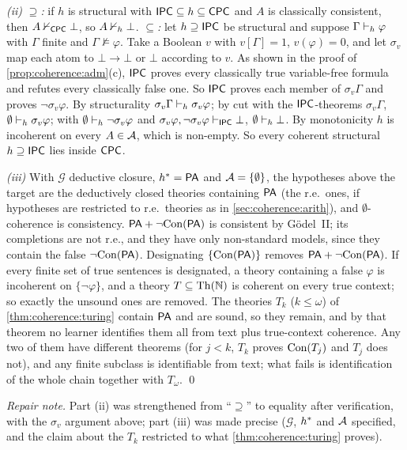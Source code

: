 \emph{(ii)} \emph{$\supseteq$:} if $h$ is structural with $\mathsf{IPC}\subseteq h\subseteq\mathsf{CPC}$ and $A$ is classically consistent, then $A\nvdash_{\mathsf{CPC}}\bot$, so $A\nvdash_h\bot$. \emph{$\subseteq$:} let $h\supseteq\mathsf{IPC}$ be structural and suppose $\Gamma\vdash_h\varphi$ with $\Gamma$ finite and $\Gamma\not\models\varphi$. Take a Boolean $v$ with $v[\Gamma]=1$, $v(\varphi)=0$, and let $\sigma_v$ map each atom to $\bot\to\bot$ or $\bot$ according to $v$. As shown in the proof of \cref{prop:coherence:adm}(c), $\mathsf{IPC}$ proves every classically true variable-free formula and refutes every classically false one. So $\mathsf{IPC}$ proves each member of $\sigma_v\Gamma$ and proves $\neg\sigma_v\varphi$. By structurality $\sigma_v\Gamma\vdash_h\sigma_v\varphi$; by cut with the $\mathsf{IPC}$-theorems $\sigma_v\Gamma$, $\emptyset\vdash_h\sigma_v\varphi$; with $\emptyset\vdash_h\neg\sigma_v\varphi$ and $\sigma_v\varphi,\neg\sigma_v\varphi\vdash_{\mathsf{IPC}}\bot$, $\emptyset\vdash_h\bot$. By monotonicity $h$ is incoherent on every $A\in\mathcal{A}$, which is non-empty. So every coherent structural $h\supseteq\mathsf{IPC}$ lies inside $\mathsf{CPC}$.

\emph{(iii)} With $\mathcal G$ deductive closure, $h^{*}=\mathsf{PA}$ and $\mathcal{A}=\{\emptyset\}$, the hypotheses above the target are the deductively closed theories containing $\mathsf{PA}$ (the r.e.\ ones, if hypotheses are restricted to r.e.\ theories as in \cref{sec:coherence:arith}), and $\emptyset$-coherence is consistency. $\mathsf{PA}+\neg\mathrm{Con}(\mathsf{PA})$ is consistent by G\"odel~II; its completions are not r.e., and they have only non-standard models, since they contain the false $\neg\mathrm{Con}(\mathsf{PA})$. Designating $\{\mathrm{Con}(\mathsf{PA})\}$ removes $\mathsf{PA}+\neg\mathrm{Con}(\mathsf{PA})$. If every finite set of true sentences is designated, a theory containing a false $\varphi$ is incoherent on $\{\neg\varphi\}$, and a theory $T\subseteq\mathrm{Th}(\mathbb{N})$ is coherent on every true context; so exactly the unsound ones are removed. The theories $T_k$ ($k\le\omega$) of \cref{thm:coherence:turing} contain $\mathsf{PA}$ and are sound, so they remain, and by that theorem no learner identifies them all from text plus true-context coherence. Any two of them have different theorems (for $j<k$, $T_k$ proves $\mathrm{Con}(T_j)$ and $T_j$ does not), and any finite subclass is identifiable from text; what fails is identification of the whole chain together with $T_\omega$. \qed

\emph{Repair note.} Part (ii) was strengthened from ``$\supseteq$'' to equality after verification, with the $\sigma_v$ argument above; part (iii) was made precise ($\mathcal G$, $h^{*}$ and $\mathcal{A}$ specified, and the claim about the $T_k$ restricted to what \cref{thm:coherence:turing} proves).

